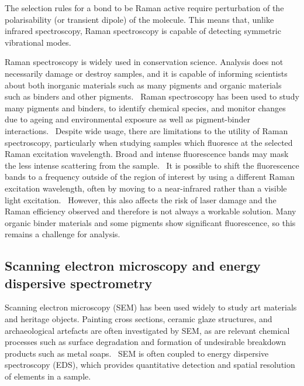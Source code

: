 The selection rules for a bond to be Raman active require perturbation of the polarisability (or transient dipole) of the molecule. This means that, unlike infrared spectroscopy, Raman spectroscopy is capable of detecting symmetric vibrational modes.~\autocite{2018RS,inphotonics}

Raman spectroscopy is widely used in conservation science. Analysis does not necessarily damage or destroy samples, and it is capable of informing scientists about both inorganic materials such as many pigments and organic materials such as binders and other pigments.~\autocite{conti_2016} Raman spectroscopy has been used to study many pigments and binders, to identify chemical species, and monitor changes due to ageing and environmental exposure as well as pigment-binder interactions.~\autocite{conti_2016,matousek_tissue,tomasini_raman,pallipurath2014,pallipurath2013,lazzari,vandenabeele} Despite wide usage, there are limitations to the utility of Raman spectroscopy, particularly when studying samples which fluoresce at the selected Raman excitation wavelength. Broad and intense fluorescence bands may mask the less intense scattering from the sample.~\autocite{Wei} It is possible to shift the fluorescence bands to a frequency outside of the region of interest by using a different Raman excitation wavelength, often by moving to a near-infrared rather than a visible light excitation.~\autocite{Kaszowska,Mancini} However, this also affects the risk of laser damage and the Raman efficiency observed and therefore is not always a workable solution. Many organic binder materials and some pigments show significant fluorescence, so this remains a challenge for analysis. 


\subsection[Scanning electron microscopy and energy dispersive spectrometry]{Scanning electron microscopy and energy dispersive spectrometry}
\label{subsection1.2.2}

Scanning electron microscopy (SEM) has been used widely to study art materials and heritage objects. Painting cross sections, ceramic glaze structures, and archaeological artefacts are often investigated by SEM, as are relevant chemical processes such as surface degradation and formation of undesirable breakdown products such as metal soaps.~\autocite{Lazzara, Hermans, Pradell, Schreiner} SEM is often coupled to energy dispersive spectroscopy (EDS), which provides quantitative detection and spatial resolution of elements in a sample.

